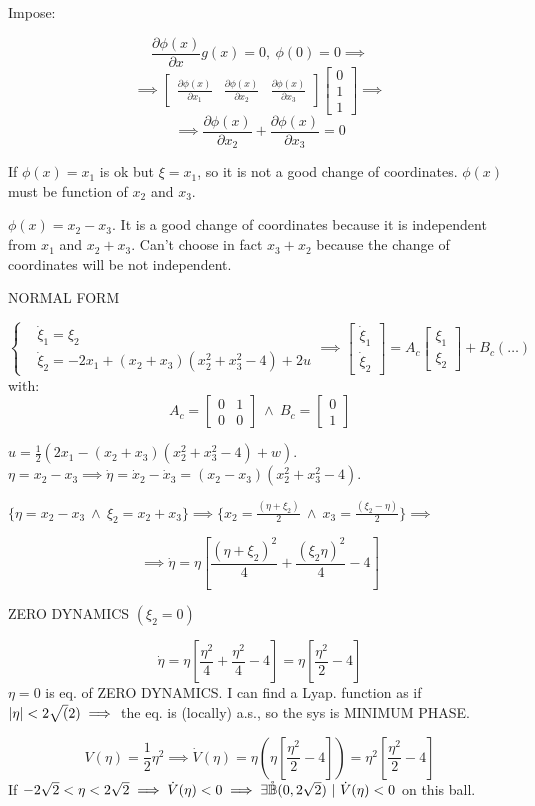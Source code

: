 Impose:

\[
	\frac{\partial{\phi(x)}}{\partial{x}}g(x) = 0,\ \phi(0)=0 \implies
\]
\[
	\implies \begin{bmatrix}\frac{\partial{\phi(x)}}{\partial{x_1}}&\frac{\partial{\phi(x)}}{\partial{x_2}}&\frac{\partial{\phi(x)}}{\partial{x_3}}\end{bmatrix}\begin{bmatrix}0\\1\\1\end{bmatrix} \implies
\]
\[
	\implies \frac{\partial{\phi(x)}}{\partial{x_2}} + \frac{\partial{\phi(x)}}{\partial{x_3}} = 0
\]

If $\phi(x)=x_1$ is ok but $\xi=x_1$, so it is not a good change of coordinates. $\phi(x)$ must be function of $x_2$ and $x_3$.

$\phi(x)=x_2-x_3$. It is a good change of coordinates because it is independent from $x_1$ and $x_2+x_3$.
Can't choose in fact $x_3+x_2$ because the change of coordinates will be not independent.

NORMAL FORM

\[
	\left\{
	\begin{aligned}
	&\dot{\xi}_1 = \xi_2 \\
	&\dot{\xi}_2 = -2x_1 + (x_2+x_3)(x_2^2 + x_3^2 -4) + 2u
	\end{aligned}
	\right. \implies \begin{bmatrix}\dot{\xi}_1\\ \dot{\xi}_2\end{bmatrix}=A_c\begin{bmatrix}\xi_1\\ \xi_2\end{bmatrix} + B_c(\dots)
\]
with:
\[
	A_c = \begin{bmatrix}0&1\\0&0\end{bmatrix}\ \land\ B_c = \begin{bmatrix}0\\1\end{bmatrix}
\]

$u = \frac{1}{2}(2x_1 -(x_2+x_3)(x_2^2+x_3^2-4) + w)$.
$\eta = x_2 - x_3 \implies \dot{\eta} = \dot{x}_2 - \dot{x}_3 = (x_2-x_3)(x_2^2 +x_3^2 -4)$.

$\{\eta = x_2 - x_3\ \land\ \xi_2=x_2+x_3\} \implies \{x_2=\frac{(\eta + \xi_2)}{2}\ \land\ x_3 = \frac{(\xi_2 -\eta)}{2}\} \implies$

\[
	\implies \dot{\eta} = \eta[\frac{(\eta + \xi_2)^2}{4} + \frac{(\xi_2\eta)^2}{4}-4]
\]

ZERO DYNAMICS $(\xi_2=0)$

\[
	\dot{\eta} = \eta[\frac{\eta^2}{4}+\frac{\eta^2}{4}-4] = \eta[\frac{\eta^2}{2}-4]
\]
$\eta = 0$ is eq. of ZERO DYNAMICS. I can find a Lyap. function as if $\lvert\eta\rvert < 2\sqrt(2) \implies$ the eq. is (locally) a.s., so the sys is MINIMUM PHASE.

\[
	V(\eta) = \frac{1}{2}\eta^2 \implies \dot{V}(\eta) = \eta(\eta[\frac{\eta^2}{2}-4]) = \eta^2[\frac{\eta^2}{2}-4]
\]
If $-2\sqrt{2} < \eta < 2\sqrt{2} \implies \dot{V}(\eta) < 0 \implies \exists \oball(0,2\sqrt{2})\ |\ \dot{V}(\eta) < 0$ on this ball. 

